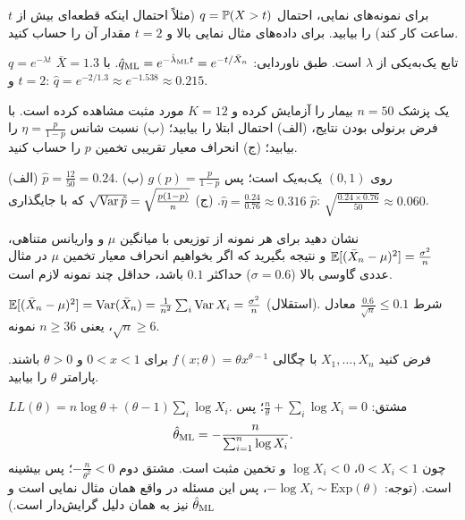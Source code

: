 \begin{exercise}
برای نمونه‌های نمایی،  احتمال $q=\mathbb{P}(X>t)$ (مثلاً احتمال اینکه قطعه‌ای بیش از $t$ ساعت کار کند) را بیابید. برای داده‌های مثال نمایی بالا و $t=2$ مقدار آن را حساب کنید.
\end{exercise}
\begin{solution}
$q=e^{-\lambda t}$ تابع یک‌به‌یکی از $\lambda$ است. طبق ناوردایی: $\hat q_{\mathrm{ML}}=e^{-\hat\lambda_{\mathrm{ML}} t}=e^{-t/\bar X_n}$. با $\bar X=1.3$ و $t=2$: $\hat q=e^{-2/1.3}\approx e^{-1.538}\approx0.215$.
\end{solution}

\begin{exercise}
یک پزشک $n=50$ بیمار را آزمایش کرده و $K=12$ مورد مثبت مشاهده کرده است. با فرض برنولی بودن نتایج، (الف)  احتمال ابتلا را بیابید؛ (ب)  نسبت شانس $\eta=\frac{p}{1-p}$ را بیابید؛ (ج) انحراف معیار تقریبی تخمین $p$ را حساب کنید.
\end{exercise}
\begin{solution}
(الف) $\hat p=\frac{12}{50}=0.24$. (ب) $g(p)=\frac{p}{1-p}$ روی $(0,1)$ یک‌به‌یک است؛ پس $\hat\eta=\frac{0.24}{0.76}\approx0.316$. (ج) $\sqrt{\operatorname{Var}\hat p}=\sqrt{\frac{p(1-p)}{n}}$ که با جایگذاری $\hat p$: $\sqrt{\frac{0.24\times0.76}{50}}\approx0.060$.
\end{solution}

\begin{exercise}
نشان دهید برای هر نمونه  از توزیعی با میانگین $\mu$ و واریانس متناهی، $\mathbb{E}[(\bar X_n-\mu)^2]=\frac{\sigma^2}{n}$ و نتیجه بگیرید که اگر بخواهیم انحراف معیار تخمین $\mu$ در مثال عددی گاوسی بالا ($\sigma=0.6$) حداکثر $0.1$ باشد، حداقل چند نمونه لازم است.
\end{exercise}
\begin{solution}
$\mathbb{E}[(\bar X_n-\mu)^2]=\operatorname{Var}(\bar X_n)=\frac1{n^2}\sum_i\operatorname{Var} X_i=\frac{\sigma^2}{n}$ (استقلال). شرط $\frac{0.6}{\sqrt n}\le0.1$ معادل $\sqrt n\ge6$، یعنی $n\ge36$ نمونه.
\end{solution}

\begin{exercise}
فرض کنید $X_1,\ldots,X_n$  با چگالی $f(x;\theta)=\theta x^{\theta-1}$ برای $0<x<1$ و $\theta>0$ باشند.  پارامتر $\theta$ را بیابید.
\end{exercise}
\begin{solution}
$LL(\theta)=n\log\theta+(\theta-1)\sum_i\log X_i$. مشتق: $\frac n\theta+\sum_i\log X_i=0$؛ پس
\[
\hat\theta_{\mathrm{ML}}=-\frac{n}{\sum_{i=1}^n\log X_i}.
\]
چون $0<X_i<1$، $\log X_i<0$ و تخمین مثبت است. مشتق دوم $-\frac n{\theta^2}<0$؛ پس بیشینه است. (توجه: $-\log X_i\sim\mathrm{Exp}(\theta)$، پس این مسئله در واقع همان مثال نمایی است و $\hat\theta_{\mathrm{ML}}$ نیز به همان دلیل گرایش‌دار است.)
\end{solution}
